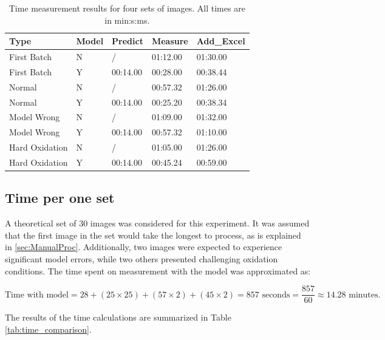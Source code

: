 \begin{table}[H]
    \centering
    \caption{Time measurement results for four sets of images. All times are in min:s:ms.}

    \begin{tabular}{lllll}
        \toprule
        \textbf{Type} & \textbf{Model} & \textbf{Predict} & \textbf{Measure} & \textbf{Add\_Excel} \\
        \midrule
        First Batch    & N & /         & 01:12.00 & 01:30.00 \\
        First Batch    & Y & 00:14.00  & 00:28.00 & 00:38.44 \\
        Normal         & N & /         & 00:57.32 & 01:26.00 \\
        Normal         & Y & 00:14.00  & 00:25.20 & 00:38.34 \\
        Model Wrong    & N & /         & 01:09.00 & 01:32.00 \\
        Model Wrong    & Y & 00:14.00  & 00:57.32 & 01:10.00 \\
        Hard Oxidation & N & /         & 01:05.00 & 01:26.00 \\
        Hard Oxidation & Y & 00:14.00  & 00:45.24 & 00:59.00 \\
        \bottomrule
    \end{tabular}
    \label{tab:time-measurements}
\end{table}



\subsection{Time per one set}

A theoretical set of 30 images was considered for this experiment. It was assumed that the first image in the set would take the longest to process, as is explained in \ref{sec:ManualProc}. Additionally, two images were expected to experience significant model errors, while two others presented challenging oxidation conditions. The time spent on measurement with the model was approximated as:

\[
\text{Time with model} = 28 + (25 \times 25) + (57 \times 2) + (45 \times 2) = 857 \text{ seconds} = \frac{857}{60} \approx 14.28 \text{ minutes}.
\]

The results of the time calculations are summarized in Table \ref{tab:time_comparison}.


